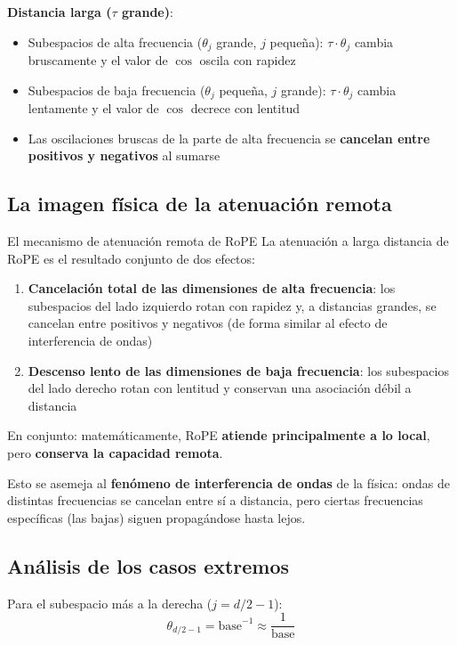 \documentclass[a4paper]{article}
\begin{document}
\textbf{Distancia larga ($\tau$ grande)}:
\begin{itemize}
  \item Subespacios de alta frecuencia ($\theta_j$ grande, $j$ pequeña): $\tau \cdot \theta_j$ cambia bruscamente y el valor de $\cos$ oscila con rapidez
  \item Subespacios de baja frecuencia ($\theta_j$ pequeña, $j$ grande): $\tau \cdot \theta_j$ cambia lentamente y el valor de $\cos$ decrece con lentitud
  \item Las oscilaciones bruscas de la parte de alta frecuencia se \textbf{cancelan entre positivos y negativos} al sumarse
\end{itemize}

\subsection{La imagen física de la atenuación remota}

\begin{importantbox}{El mecanismo de atenuación remota de RoPE}
La atenuación a larga distancia de RoPE es el resultado conjunto de dos efectos:
\begin{enumerate}
  \item \textbf{Cancelación total de las dimensiones de alta frecuencia}: los subespacios del lado izquierdo rotan con rapidez y, a distancias grandes, se cancelan entre positivos y negativos (de forma similar al efecto de interferencia de ondas)
  \item \textbf{Descenso lento de las dimensiones de baja frecuencia}: los subespacios del lado derecho rotan con lentitud y conservan una asociación débil a distancia
\end{enumerate}
En conjunto: matemáticamente, RoPE \textbf{atiende principalmente a lo local}, pero \textbf{conserva la capacidad remota}.
\end{importantbox}

Esto se asemeja al \textbf{fenómeno de interferencia de ondas} de la física: ondas de distintas frecuencias se cancelan entre sí a distancia, pero ciertas frecuencias específicas (las bajas) siguen propagándose hasta lejos.

\subsection{Análisis de los casos extremos}

Para el subespacio más a la derecha ($j = d/2 - 1$):
$$
\theta_{d/2-1} = \text{base}^{-1} \approx \frac{1}{\text{base}}
$$
\end{document}
